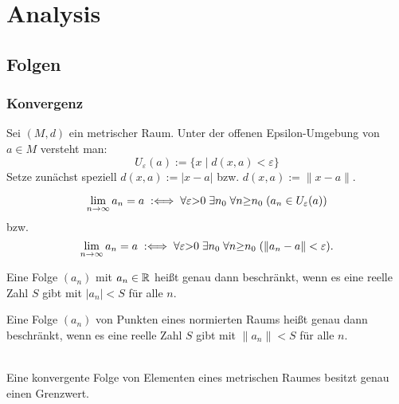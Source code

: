 
\chapter{Analysis}
\section{Folgen}
\subsection{Konvergenz}

\begin{Definition}%
Sei $(M,d)$ ein metrischer Raum. Unter der offenen Epsilon-Umgebung
von $a\in M$ versteht man:%
\[U_\varepsilon(a) := \{x\mid d(x,a)<\varepsilon\}\]
Setze zunächst speziell $d(x,a):=|x-a|$ bzw. $d(x,a):=\|x-a\|$.
\end{Definition}

\begin{Definition}%
\label{def:lim}
\[\lim_{n\to\infty} a_n = a
\;:\Longleftrightarrow\; \forall\varepsilon{>}0\;\exists n_0\;\forall n{\ge}n_0\;(a_n\in U_\varepsilon(a))\]
bzw.
\[\lim_{n\to\infty} a_n = a
\;:\Longleftrightarrow\; \forall\varepsilon{>}0\;\exists n_0\;\forall n{\ge}n_0\;(\|a_n-a\|<\varepsilon).\]
\end{Definition}

\begin{Definition}%
\label{def:bseq}
Eine Folge $(a_n)$ mit $a_n\in\mathbb R$ heißt genau dann beschränkt,
wenn es eine reelle Zahl $S$ gibt mit $|a_n|<S$ für alle $n$.

Eine Folge $(a_n)$ von Punkten eines normierten Raums heißt genau
dann beschränkt, wenn es eine reelle Zahl $S$ gibt mit $\|a_n\|<S$
für alle $n$.
\end{Definition}

\begin{Satz}\mbox{}\\
Eine konvergente Folge von Elementen eines metrischen Raumes
besitzt genau einen Grenzwert.
\end{Satz}

